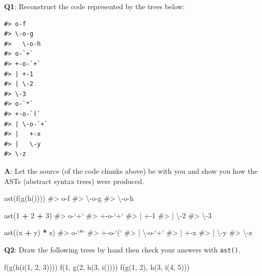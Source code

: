\documentclass[
]{krantz}
\makeatletter
\newenvironment{Shaded}{\begin{snugshade}}{\end{snugshade}}
\newcommand{\CommentTok}[1]{\textcolor[rgb]{0.56,0.35,0.01}{\textit{#1}}}
\newcommand{\DecValTok}[1]{\textcolor[rgb]{0.00,0.00,0.81}{#1}}
\newcommand{\KeywordTok}[1]{\textcolor[rgb]{0.13,0.29,0.53}{\textbf{#1}}}
\newcommand{\NormalTok}[1]{#1}
\newcommand{\OperatorTok}[1]{\textcolor[rgb]{0.81,0.36,0.00}{\textbf{#1}}}
\newcommand{\StringTok}[1]{\textcolor[rgb]{0.31,0.60,0.02}{#1}}
\newenvironment{kframe}{%
\medskip{}
\setlength{\fboxsep}{.8em}
 \def\at@end@of@kframe{}%
 \ifinner\ifhmode%
  \def\at@end@of@kframe{\end{minipage}}%
  \begin{minipage}{\columnwidth}%
 \fi\fi%
 \def\FrameCommand##1{\hskip\@totalleftmargin \hskip-\fboxsep
 \colorbox{shadecolor}{##1}\hskip-\fboxsep
     \hskip-\linewidth \hskip-\@totalleftmargin \hskip\columnwidth}%
 \MakeFramed {\advance\hsize-\width
   \@totalleftmargin\z@ \linewidth\hsize
   \@setminipage}}%
 {\par\unskip\endMakeFramed%
 \at@end@of@kframe}
\renewenvironment{Shaded}{\begin{kframe}}{\end{kframe}}
\renewcommand{\KeywordTok} [1]{\textcolor[rgb]{0.00,0.44,0.13}{{#1}}}
\renewcommand{\DecValTok}  [1]{\textcolor[rgb]{0.25,0.63,0.44}{{#1}}}
\renewcommand{\StringTok}  [1]{\textcolor[rgb]{0.25,0.44,0.63}{{#1}}}
\renewcommand{\CommentTok} [1]{\textcolor[rgb]{0.38,0.63,0.69}{{#1}}}
\renewcommand{\NormalTok}  [1]{{#1}}
\makeatother
\begin{document}
\textbf{{Q1}}: Reconstruct the code represented by the trees below:

\begin{verbatim}
#> o-f 
#> \-o-g 
#>   \-o-h
#> o-`+` 
#> +-o-`+` 
#> | +-1 
#> | \-2 
#> \-3
#> o-`*` 
#> +-o-`(` 
#> | \-o-`+` 
#> |   +-x 
#> |   \-y 
#> \-z
\end{verbatim}

\textbf{{A}}: Let the source (of the code chunks above) be with you and show you how the ASTs (abstract syntax trees) were produced.

\begin{Shaded}
\begin{Highlighting}[]
\KeywordTok{ast}\NormalTok{(}\KeywordTok{f}\NormalTok{(}\KeywordTok{g}\NormalTok{(}\KeywordTok{h}\NormalTok{())))}
\CommentTok{#> o-f }
\CommentTok{#> \textbackslash{}-o-g }
\CommentTok{#>   \textbackslash{}-o-h}

\KeywordTok{ast}\NormalTok{(}\DecValTok{1} \OperatorTok{+}\StringTok{ }\DecValTok{2} \OperatorTok{+}\StringTok{ }\DecValTok{3}\NormalTok{)}
\CommentTok{#> o-`+` }
\CommentTok{#> +-o-`+` }
\CommentTok{#> | +-1 }
\CommentTok{#> | \textbackslash{}-2 }
\CommentTok{#> \textbackslash{}-3}

\KeywordTok{ast}\NormalTok{((x }\OperatorTok{+}\StringTok{ }\NormalTok{y) }\OperatorTok{*}\StringTok{ }\NormalTok{z)}
\CommentTok{#> o-`*` }
\CommentTok{#> +-o-`(` }
\CommentTok{#> | \textbackslash{}-o-`+` }
\CommentTok{#> |   +-x }
\CommentTok{#> |   \textbackslash{}-y }
\CommentTok{#> \textbackslash{}-z}
\end{Highlighting}
\end{Shaded}

\textbf{{Q2}}: Draw the following trees by hand then check your answers with \texttt{ast()}.

\begin{Shaded}
\begin{Highlighting}[]
\KeywordTok{f}\NormalTok{(}\KeywordTok{g}\NormalTok{(}\KeywordTok{h}\NormalTok{(}\KeywordTok{i}\NormalTok{(}\DecValTok{1}\NormalTok{, }\DecValTok{2}\NormalTok{, }\DecValTok{3}\NormalTok{))))}
\KeywordTok{f}\NormalTok{(}\DecValTok{1}\NormalTok{, }\KeywordTok{g}\NormalTok{(}\DecValTok{2}\NormalTok{, }\KeywordTok{h}\NormalTok{(}\DecValTok{3}\NormalTok{, }\KeywordTok{i}\NormalTok{())))}
\KeywordTok{f}\NormalTok{(}\KeywordTok{g}\NormalTok{(}\DecValTok{1}\NormalTok{, }\DecValTok{2}\NormalTok{), }\KeywordTok{h}\NormalTok{(}\DecValTok{3}\NormalTok{, }\KeywordTok{i}\NormalTok{(}\DecValTok{4}\NormalTok{, }\DecValTok{5}\NormalTok{)))}
\end{Highlighting}
\end{Shaded}
\end{document}
